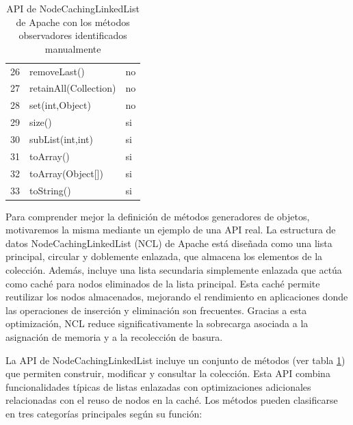 \begin{table}[]
{\begin{tabular}{|l|l|l|}
26 & removeLast() & no \\
27 & retainAll(Collection) & no \\
28 & set(int,Object) & no \\
29 & size() & si \\
30 & subList(int,int) & si \\
31 & toArray() & si \\
32 & toArray(Object[]) & si \\
33 & toString() & si \\
\hline
\end{tabular}
}
\caption{API de NodeCachingLinkedList de Apache con los métodos observadores identificados manualmente}
\label{tab:ncl-api}
\end{table}


Para comprender mejor la definición de métodos generadores de objetos, motivaremos la misma mediante un ejemplo de una API real. La estructura de datos NodeCachingLinkedList (NCL) de Apache \cite{apache} está diseñada como una lista principal, circular y doblemente enlazada, que almacena los elementos de la colección. Además, incluye una lista secundaria simplemente enlazada que actúa como caché para nodos eliminados de la lista principal. Esta caché permite reutilizar los nodos almacenados, mejorando el rendimiento en aplicaciones donde las operaciones de inserción y eliminación son frecuentes. Gracias a esta optimización, NCL reduce significativamente la sobrecarga asociada a la asignación de memoria y a la recolección de basura. 

La API de NodeCachingLinkedList incluye un conjunto de métodos (ver tabla \ref{tab:ncl-api}) que permiten construir, modificar y consultar la colección. Esta API combina funcionalidades típicas de listas enlazadas con optimizaciones adicionales relacionadas con el reuso de nodos en la caché. Los métodos pueden clasificarse en tres categorías principales según su función: 

